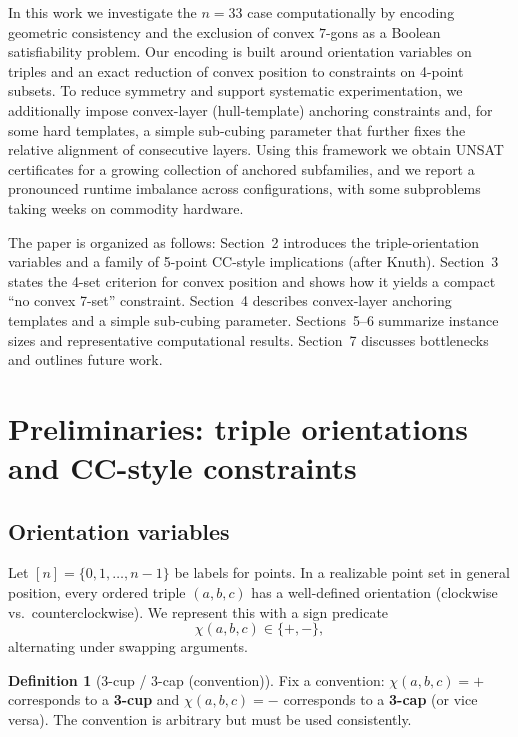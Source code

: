 \documentclass[11pt,a4paper]{article}
\theoremstyle{definition}
\newtheorem{definition}{Definition}
\begin{document}
In this work we investigate the $n=33$ case computationally by encoding geometric consistency and the exclusion of convex $7$-gons as a Boolean satisfiability problem. Our encoding is built around orientation variables on triples and an exact reduction of convex position to constraints on 4-point subsets. To reduce symmetry and support systematic experimentation, we additionally impose convex-layer (hull-template) anchoring constraints and, for some hard templates, a simple sub-cubing parameter that further fixes the relative alignment of consecutive layers. Using this framework we obtain UNSAT certificates for a growing collection of anchored subfamilies, and we report a pronounced runtime imbalance across configurations, with some subproblems taking weeks on commodity hardware.

The paper is organized as follows: Section~2 introduces the triple-orientation variables and a family of 5-point CC-style implications (after Knuth).
Section~3 states the 4-set criterion for convex position and shows how it yields a compact ``no convex 7-set'' constraint.
Section~4 describes convex-layer anchoring templates and a simple sub-cubing parameter.
Sections~5--6 summarize instance sizes and representative computational results.
Section~7 discusses bottlenecks and outlines future work.

\section{Preliminaries: triple orientations and CC-style constraints}

\subsection{Orientation variables}

Let $[n]=\{0,1,\dots,n-1\}$ be labels for points. In a realizable point set in general position, every ordered triple $(a,b,c)$ has a well-defined orientation (clockwise vs.\ counterclockwise). We represent this with a sign predicate
\[
\chi(a,b,c)\in\{+,-\},
\]
alternating under swapping arguments.

\begin{definition}[3-cup / 3-cap (convention)]
Fix a convention: $\chi(a,b,c)=+$ corresponds to a \textbf{3-cup} and $\chi(a,b,c)=-$ corresponds to a \textbf{3-cap} (or vice versa). The convention is arbitrary but must be used consistently.
\end{definition}
\end{document}
